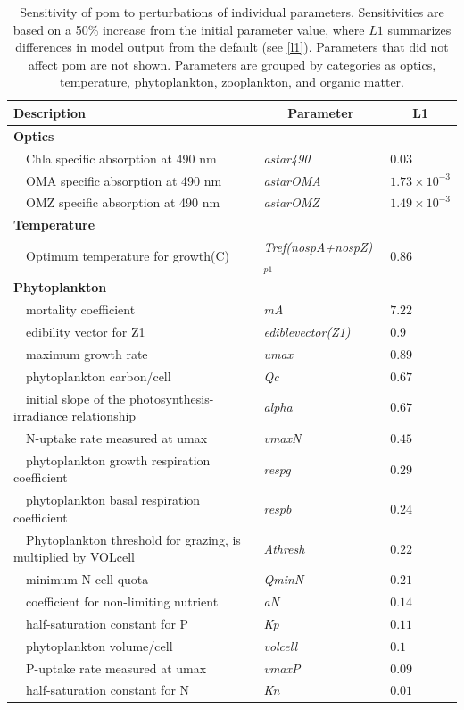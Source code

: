 \documentclass[preprint]{elsarticle}\usepackage[]{graphicx}\usepackage[]{color}
\begin{document}
\begin{table}[!tbp]
{\footnotesize
\caption{Sensitivity of \ac{pom} to perturbations of individual parameters.  Sensitivities are based on a 50\% increase from the initial parameter value, where $L1$ summarizes differences in model output from the default (see \cref{l1}).  Parameters that did not affect \ac{pom} are not shown.  Parameters are grouped by categories as optics, temperature, phytoplankton, zooplankton, and organic matter.\label{tab:om1sens}} 
\begin{center}
\begin{tabular}{lll}
\hline\hline
\multicolumn{1}{l}{Description}&\multicolumn{1}{c}{Parameter}&\multicolumn{1}{c}{L1}\tabularnewline
\hline
{\bfseries Optics}&&\tabularnewline
~~Chla specific absorption at 490 nm&\textit{astar490}&$0.03$\tabularnewline
~~OMA specific absorption at 490 nm&\textit{astarOMA}&$1.73\times 10^{-3}$\tabularnewline
~~OMZ specific absorption at 490 nm&\textit{astarOMZ}&$1.49\times 10^{-3}$\tabularnewline
\hline
{\bfseries Temperature}&&\tabularnewline
~~Optimum temperature for growth(C)&\textit{Tref(nospA+nospZ)$_{p1}$}&$0.86$\tabularnewline
\hline
{\bfseries Phytoplankton}&&\tabularnewline
~~mortality coefficient&\textit{mA}&$7.22$\tabularnewline
~~edibility vector for Z1&\textit{ediblevector(Z1)}&$0.9$\tabularnewline
~~maximum growth rate&\textit{umax}&$0.89$\tabularnewline
~~phytoplankton carbon/cell&\textit{Qc}&$0.67$\tabularnewline
~~initial slope of the photosynthesis-irradiance relationship&\textit{alpha}&$0.67$\tabularnewline
~~N-uptake rate measured at umax&\textit{vmaxN}&$0.45$\tabularnewline
~~phytoplankton growth respiration coefficient&\textit{respg}&$0.29$\tabularnewline
~~phytoplankton basal respiration coefficient&\textit{respb}&$0.24$\tabularnewline
~~Phytoplankton threshold for grazing, is multiplied by VOLcell&\textit{Athresh}&$0.22$\tabularnewline
~~minimum N cell-quota&\textit{QminN}&$0.21$\tabularnewline
~~coefficient for non-limiting nutrient&\textit{aN}&$0.14$\tabularnewline
~~half-saturation constant for P&\textit{Kp}&$0.11$\tabularnewline
~~phytoplankton volume/cell&\textit{volcell}&$0.1$\tabularnewline
~~P-uptake rate measured at umax&\textit{vmaxP}&$0.09$\tabularnewline
~~half-saturation constant for N&\textit{Kn}&$0.01$\tabularnewline

\end{tabular}
\end{center}}
\end{table}
\end{document}

